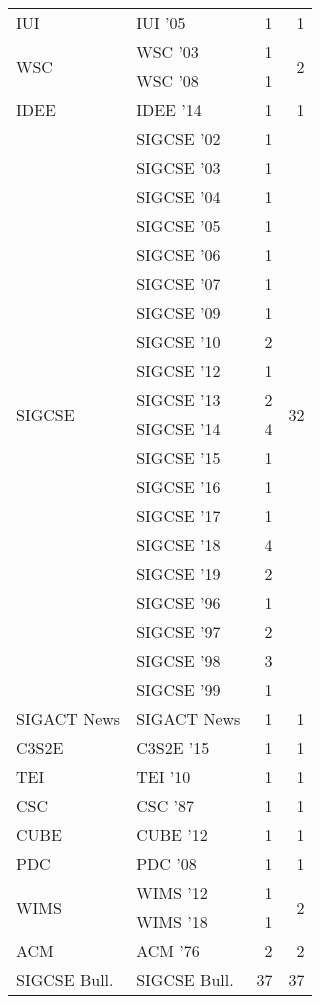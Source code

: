 \begin{table*}[t]
\begin{tabular}{llrr}
\multirow{1}{*}{IUI } & IUI '05 & 1 & \multirow{1}{*}{1}\\
\multirow{2}{*}{WSC } & WSC '03 & 1 & \multirow{2}{*}{2}\\
& WSC '08 & 1 &\\
\multirow{1}{*}{IDEE } & IDEE '14 & 1 & \multirow{1}{*}{1}\\
\multirow{20}{*}{SIGCSE } & SIGCSE '02 & 1 & \multirow{20}{*}{32}\\
& SIGCSE '03 & 1 &\\
& SIGCSE '04 & 1 &\\
& SIGCSE '05 & 1 &\\
& SIGCSE '06 & 1 &\\
& SIGCSE '07 & 1 &\\
& SIGCSE '09 & 1 &\\
& SIGCSE '10 & 2 &\\
& SIGCSE '12 & 1 &\\
& SIGCSE '13 & 2 &\\
& SIGCSE '14 & 4 &\\
& SIGCSE '15 & 1 &\\
& SIGCSE '16 & 1 &\\
& SIGCSE '17 & 1 &\\
& SIGCSE '18 & 4 &\\
& SIGCSE '19 & 2 &\\
& SIGCSE '96 & 1 &\\
& SIGCSE '97 & 2 &\\
& SIGCSE '98 & 3 &\\
& SIGCSE '99 & 1 &\\
\multirow{1}{*}{SIGACT News} & SIGACT News & 1 & \multirow{1}{*}{1}\\
\multirow{1}{*}{C3S2E } & C3S2E '15 & 1 & \multirow{1}{*}{1}\\
\multirow{1}{*}{TEI } & TEI '10 & 1 & \multirow{1}{*}{1}\\
\multirow{1}{*}{CSC } & CSC '87 & 1 & \multirow{1}{*}{1}\\
\multirow{1}{*}{CUBE } & CUBE '12 & 1 & \multirow{1}{*}{1}\\
\multirow{1}{*}{PDC } & PDC '08 & 1 & \multirow{1}{*}{1}\\
\multirow{2}{*}{WIMS } & WIMS '12 & 1 & \multirow{2}{*}{2}\\
& WIMS '18 & 1 &\\
\multirow{1}{*}{ACM } & ACM '76 & 2 & \multirow{1}{*}{2}\\
\multirow{1}{*}{SIGCSE Bull.} & SIGCSE Bull. & 37 & \multirow{1}{*}{37}\\

\end{tabular}
\end{table*}
